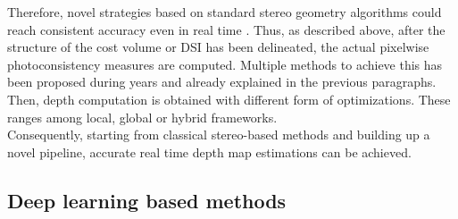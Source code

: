 Therefore, novel strategies based on standard stereo geometry algorithms could reach consistent accuracy even in real time \cite{Hernandez-Juarez2016}.
Thus, as described above, after the structure of the cost volume or DSI has been delineated, the actual pixelwise photoconsistency measures are computed.
Multiple methods to achieve this has been proposed during years and already explained in the previous paragraphs.
Then, depth computation is obtained with different form of optimizations. 
These ranges among local, global or hybrid frameworks. \\
Consequently, starting from classical stereo-based methods and building up a novel pipeline, accurate real time depth map estimations can be achieved.

\subsection{Deep learning based methods}
\label{subsection:deep-learn-meth}

